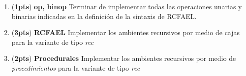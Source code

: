 \documentclass{article}
\newcommand{\grade}[1]{(\textbf{#1pts}) }
\begin{document}
\begin{enumerate}
\item \grade{1} \textbf{op, binop} Terminar de implementar todas las operaciones unarias y binarias indicadas en la definición de la sintaxis de RCFAEL. \\

\item \grade{3} \textbf{RCFAEL} Implementar los ambientes recursivos por medio de cajas para la variante de tipo \emph{rec} \\

\item \grade{2} \textbf{Procedurales} Implementar los ambientes recursivos por medio de \emph{procedimientos} para la variante de tipo \emph{rec} \\

\end{enumerate}
\end{document}
